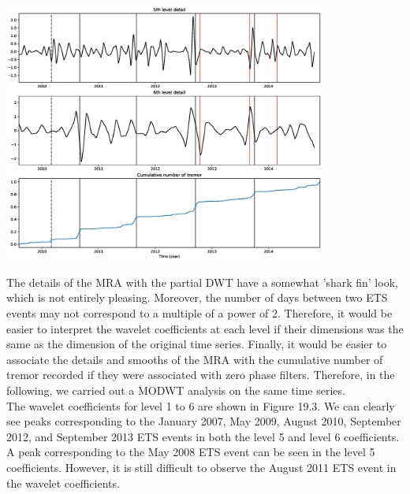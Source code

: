\documentclass[main.tex]{subfiles}
\begin{document}
\begin{center}
\includegraphics[width=300pt, trim={3.5cm 2.5cm 3.5cm 3cm}, clip]{Figures/slowslip_results/Figure_2.eps}
\captionsetup{type=figure}
\end{center}

The details of the MRA with the partial DWT have a somewhat 'shark fin' look, which is not entirely pleasing. Moreover, the number of days between two ETS events may not correspond to a multiple of a power of 2. Therefore, it would be easier to interpret the wavelet coefficients at each level if their dimensions was the same as the dimension of the original time series. Finally, it would be easier to associate the details and smooths of the MRA with the cumulative number of tremor recorded if they were associated with zero phase filters. Therefore, in the following, we carried out a MODWT analysis on the same time series. \\

The wavelet coefficients for level 1 to 6 are shown in Figure 19.3. We can clearly see peaks corresponding to the January 2007, May 2009, August 2010, September 2012, and September 2013 ETS events in both the level 5 and level 6 coefficients. A peak corresponding to the May 2008 ETS event can be seen in the level 5 coefficients. However, it is still difficult to observe the August 2011 ETS event in the wavelet coefficients. \\
\end{document}
